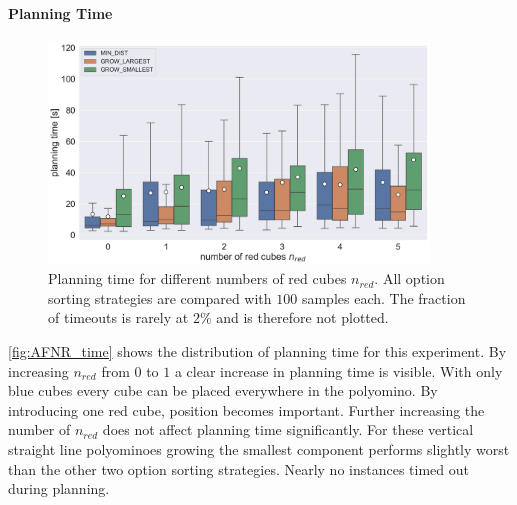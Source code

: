 \paragraph{Planning Time}

\begin{figure}
	\centering
	\includegraphics[width=0.9\textwidth]{figures/plots/AFNR_time.pdf}
	\caption[Planning time for number of red cubes]{Planning time for different numbers of red cubes $n_\textit{red}$. All option sorting strategies are compared with $100$ samples each. The fraction of timeouts is rarely at $2\%$ and is therefore not plotted.}
	\label{fig:AFNR_time}
\end{figure}


\autoref{fig:AFNR_time} shows the distribution of planning time for this experiment.
By increasing $n_\textit{red}$ from $0$ to $1$ a clear increase in planning time is visible.
With only blue cubes every cube can be placed everywhere in the polyomino.
By introducing one red cube, position becomes important.
Further increasing the number of $n_\textit{red}$ does not affect planning time significantly.
For these vertical straight line polyominoes growing the smallest component performs slightly worst than the other two option sorting strategies.
Nearly no instances timed out during planning. 



